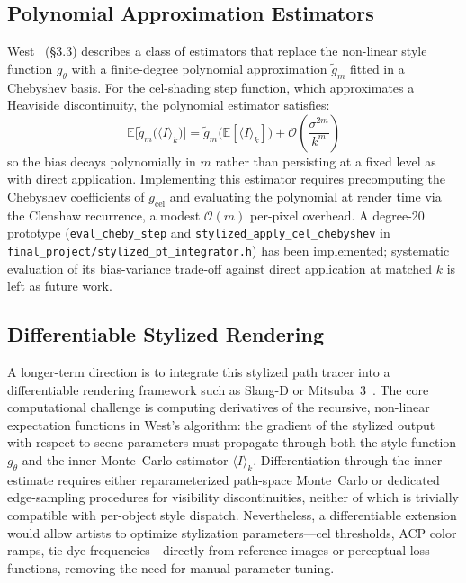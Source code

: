 \documentclass{article}
\begin{document}
\subsection{Polynomial Approximation Estimators}

West~\cite{west2024stylized} (\S3.3) describes a class of estimators that replace the non-linear style function $g_\theta$ with a finite-degree polynomial approximation $\tilde{g}_m$ fitted in a Chebyshev basis.
For the cel-shading step function, which approximates a Heaviside discontinuity, the polynomial estimator satisfies:
\begin{equation}
    \mathbb{E}\bigl[\tilde{g}_m\bigl(\langle I \rangle_k\bigr)\bigr] = \tilde{g}_m\bigl(\mathbb{E}[\langle I \rangle_k]\bigr) + \mathcal{O}\!\left(\frac{\sigma^{2m}}{k^m}\right)
    \label{eq:cheby_bias}
\end{equation}
so the bias decays polynomially in $m$ rather than persisting at a fixed level as with direct application.
Implementing this estimator requires precomputing the Chebyshev coefficients of $g_{\text{cel}}$ and evaluating the polynomial at render time via the Clenshaw recurrence, a modest $\mathcal{O}(m)$ per-pixel overhead.
A degree-20 prototype (\texttt{eval\_cheby\_step} and \texttt{stylized\_apply\_cel\_chebyshev} in \texttt{final\_project/stylized\_pt\_integrator.h}) has been implemented; systematic evaluation of its bias-variance trade-off against direct application at matched $k$ is left as future work.

\subsection{Differentiable Stylized Rendering}

A longer-term direction is to integrate this stylized path tracer into a differentiable rendering framework such as Slang-D or Mitsuba~3~\cite{li2018differentiable}.
The core computational challenge is computing derivatives of the recursive, non-linear expectation functions in West's algorithm: the gradient of the stylized output with respect to scene parameters must propagate through both the style function $g_\theta$ and the inner Monte~Carlo estimator $\langle I \rangle_k$.
Differentiation through the inner-estimate requires either reparameterized path-space Monte~Carlo or dedicated edge-sampling procedures for visibility discontinuities, neither of which is trivially compatible with per-object style dispatch.
Nevertheless, a differentiable extension would allow artists to optimize stylization parameters---cel thresholds, ACP color ramps, tie-dye frequencies---directly from reference images or perceptual loss functions, removing the need for manual parameter tuning.
\end{document}
